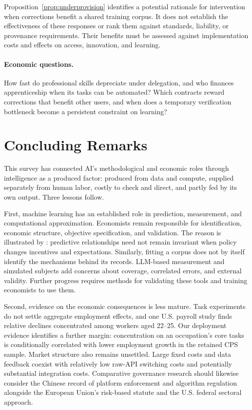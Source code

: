 \documentclass[12pt]{article}
\theoremstyle{plain}
\theoremstyle{definition}
\theoremstyle{remark}
\begin{document}
Proposition~\ref{prop:underprovision} identifies a potential rationale
for intervention when corrections benefit a shared training corpus.
It does not establish the effectiveness of these responses or rank them
against standards, liability, or provenance requirements. Their benefits
must be assessed against implementation costs and effects on access,
innovation, and learning.

\paragraph{Economic questions.}
How fast do professional skills depreciate under delegation, and who
finances apprenticeship when its tasks can be automated? Which contracts
reward corrections that benefit other users, and when does a temporary
verification bottleneck become a persistent constraint on learning?

\section{Concluding Remarks}\label{sec:conclusion}

This survey has connected AI's methodological and economic roles
through intelligence as a produced factor: produced from data and
compute, supplied separately from human labor, costly to check and
direct, and partly fed by its own output. Three lessons follow.

First, machine learning has an established role in prediction,
measurement, and computational approximation. Economists remain
responsible for identification, economic structure, objective
specification, and validation. The reason is illustrated by
\citet{Lucas1976}: predictive relationships need not remain invariant
when policy changes incentives and expectations. Similarly, fitting a
corpus does not by itself identify the mechanisms behind its records.
LLM-based measurement and simulated subjects add concerns about
coverage, correlated errors, and external validity. Further progress
requires methods for validating these tools and training economists to
use them.

Second, evidence on the economic consequences is less mature. Task
experiments do not settle aggregate employment effects, and one U.S.
payroll study finds relative declines concentrated among workers aged
22--25. Our deployment evidence identifies a further margin:
concentration on an occupation's core tasks is conditionally correlated
with lower employment growth in the retained CPS sample. Market structure
also remains unsettled. Large fixed costs and data feedback coexist
with relatively low raw-API switching costs and potentially substantial
integration costs. Comparative governance research should likewise
consider the Chinese record of platform enforcement and algorithm
regulation alongside the European Union's risk-based statute and the
U.S. federal sectoral approach.
\end{document}
